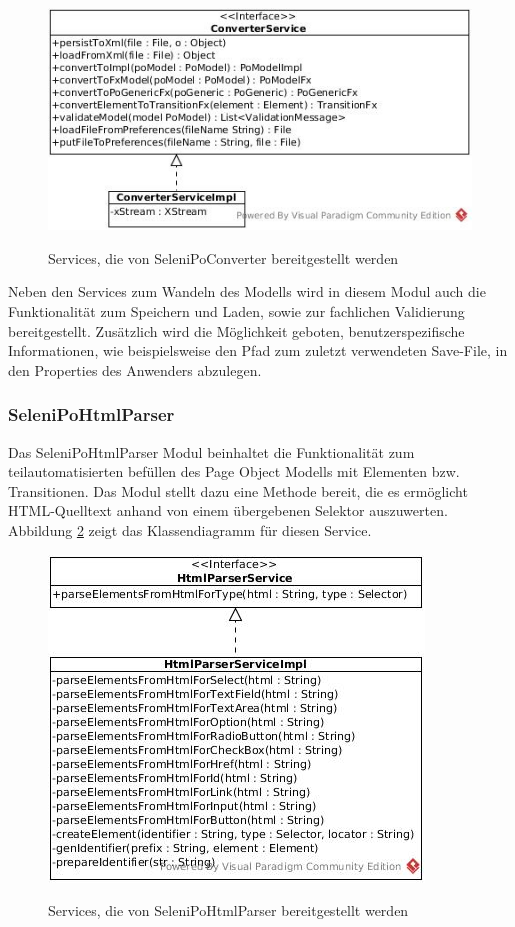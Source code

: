 \begin{figure}[htb]
  \centering  
  \includegraphics[scale=0.5]{img/ConverterService.jpg}\\
  \caption{Services, die von SeleniPoConverter bereitgestellt werden}
  \label{fig:converter_service}
\end{figure}

Neben den Services zum Wandeln des Modells wird in diesem Modul auch die Funktionalität zum Speichern und Laden, sowie zur fachlichen Validierung bereitgestellt.
Zusätzlich wird die Möglichkeit geboten, benutzerspezifische Informationen, wie beispielsweise den Pfad zum zuletzt verwendeten Save-File, in den Properties des Anwenders abzulegen.


\subsubsection{SeleniPoHtmlParser}
\label{sec:selenipohtmlparser}

Das SeleniPoHtmlParser Modul beinhaltet die Funktionalität zum teilautomatisierten befüllen des Page Object Modells mit Elementen bzw. Transitionen.
Das Modul stellt dazu eine Methode bereit, die es ermöglicht HTML-Quelltext anhand von einem übergebenen Selektor auszuwerten.
Abbildung \ref{fig:html_service} zeigt das Klassendiagramm für diesen Service.

\begin{figure}[htb]
  \centering  
  \includegraphics[scale=0.5]{img/HtmlParserService.jpg}\\
  \caption{Services, die von SeleniPoHtmlParser bereitgestellt werden}
  \label{fig:html_service}
\end{figure}

